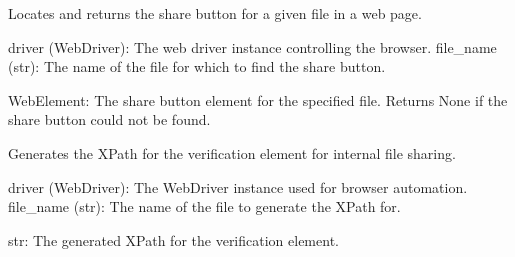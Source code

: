 \documentclass[letterpaper,10pt,english]{sphinxmanual}
\begin{document}
\begin{fulllineitems}
\label{\detokenize{utils:utils.file_management.generate_file_share_button}}
\pysigstartsignatures
{}
\pysigstopsignatures
\sphinxAtStartPar
Locates and returns the share button for a given file in a web page.
\begin{description}
\sphinxAtStartPar
driver (WebDriver): The web driver instance controlling the browser.
file\_name (str): The name of the file for which to find the share button.

\sphinxAtStartPar
WebElement: The share button element for the specified file.
Returns None if the share button could not be found.

\end{description}

\end{fulllineitems}


\begin{fulllineitems}
\label{\detokenize{utils:utils.file_management.generate_internal_sharing_verification_element_exists}}
\pysigstartsignatures
{}
\pysigstopsignatures
\sphinxAtStartPar
Generates the XPath for the verification element for internal file sharing.
\begin{description}
\sphinxAtStartPar
driver (WebDriver): The WebDriver instance used for browser automation.
file\_name (str): The name of the file to generate the XPath for.

\sphinxAtStartPar
str: The generated XPath for the verification element.

\end{description}

\end{fulllineitems}

\end{document}

